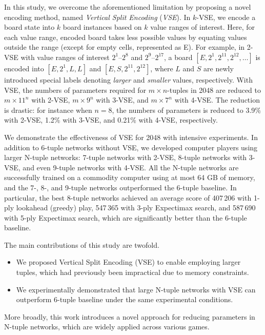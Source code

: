In this study, we overcome the aforementioned limitation by proposing a novel encoding method, named \emph{Vertical Split Encoding} (\emph{VSE}). In $k$-VSE, we encode a board state into $k$ board instances based on $k$ value ranges of interest. Here, for each value range, encoded board takes less possible values by equating values outside the range (except for empty cells, represented as E).
For example, in 2-VSE with value ranges of interest $2^1$--$2^8$ and $2^9$--$2^{17}$, a board $[E, 2^1, 2^{11}, 2^{12}, \ldots]$ is encoded into $[E, 2^1, L, L]$ and $[E, S, 2^{11}, 2^{12}]$, where $L$ and $S$ are newly introduced special labels denoting \emph{larger} and \emph{smaller} values, respectively.
With VSE, the numbers of parameters required for $m$\,$\times$\,$n$-tuples in 2048 are reduced to $m\times 11^n$ with 2-VSE, $m\times 9^n$ with 3-VSE, and $m\times 7^n$ with 4-VSE. The reduction is drastic: for instance when $n=8$, the numbers of parameters is reduced to 3.9\% with 2-VSE, 1.2\% with 3-VSE, and 0.21\% with 4-VSE, respectively.


We demonstrate the effectiveness of VSE for 2048 with intensive experiments.
In addition to 6-tuple networks without VSE, we developed computer players using larger N-tuple networks: 7-tuple networks with 2-VSE, 8-tuple networks with 3-VSE, and even 9-tuple networks with 4-VSE.
All the N-tuple networks are successfully trained on a commodity computer using at most 64 GB of memory, and the 7-, 8-, and 9-tuple networks outperformed the 6-tuple baseline.
In particular, the best 8-tuple networks achieved an average score of 407\,206 with 1-ply lookahead (greedy) play, 547\,365 with 3-ply Expectimax search, and 587\,690 with 5-ply Expectimax search, which are significantly better than the 6-tuple baseline.



The main contributions of this study are twofold.
\begin{itemize}
 \item We proposed Vertical Split Encoding (VSE) to enable employing larger tuples, which had previously been impractical due to memory constraints.
 \item We experimentally demonstrated that large N-tuple networks with VSE can outperform 6-tuple baseline under the same experimental conditions.
\end{itemize}
More broadly, this work introduces a novel approach for reducing parameters in N-tuple networks, which are widely applied across various games.
